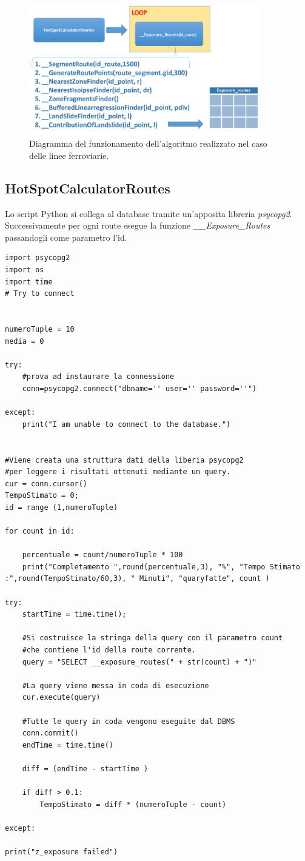 \begin{figure}[h]
	\centering
	\includegraphics[width=0.9\textwidth]{images/algorithm2}
	\caption{Diagramma del funzionamento dell'algoritmo realizzato nel caso delle linee ferroviarie.}
	\label{diagramma_algoritmo2}
\end{figure}

\subsection{HotSpotCalculatorRoutes}
Lo script Python si collega al database tramite un'apposita libreria \textit{psycopg2}. Successivamente per ogni route esegue la funzione \textit{\_\_Exposure\_Routes} passandogli come parametro l'id. 

\begin{lstlisting}[style = python]
import psycopg2
import os
import time
# Try to connect


numeroTuple = 10
media = 0

try:
	#prova ad instaurare la connessione
	conn=psycopg2.connect("dbname='' user='' password=''")

except:
	print("I am unable to connect to the database.")


#Viene creata una struttura dati della liberia psycopg2
#per leggere i risultati ottenuti mediante un query.
cur = conn.cursor()
TempoStimato = 0;
id = range (1,numeroTuple)

for count in id:

	percentuale = count/numeroTuple * 100
	print("Completamento ",round(percentuale,3), "%", "Tempo Stimato :",round(TempoStimato/60,3), " Minuti", "quaryfatte", count )

try:
	startTime = time.time();
	
	#Si costruisce la stringa della query con il parametro count
	#che contiene l'id della route corrente.
	query = "SELECT __exposure_routes(" + str(count) + ")"
	
	#La query viene messa in coda di esecuzione
	cur.execute(query)
	
	#Tutte le query in coda vengono eseguite dal DBMS
	conn.commit()
	endTime = time.time()

	diff = (endTime - startTime )
	
	if diff > 0.1:
		TempoStimato = diff * (numeroTuple - count)
		
except:

print("z_exposure failed")

\end{lstlisting}

